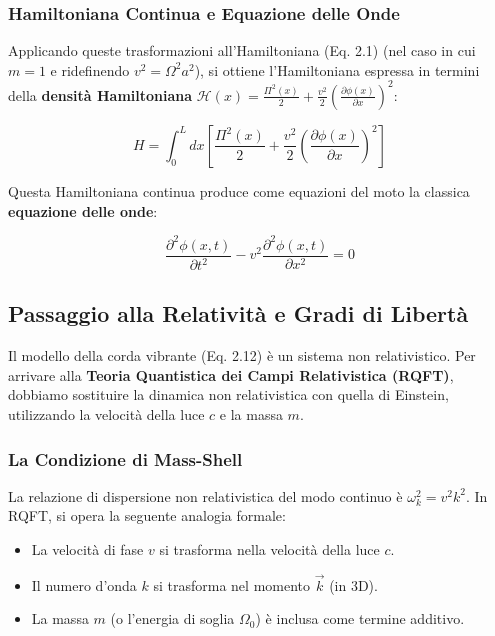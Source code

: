 \subsubsection{Hamiltoniana Continua e Equazione delle Onde}

Applicando queste trasformazioni all'Hamiltoniana (Eq. 2.1) (nel caso in cui $m=1$ e ridefinendo $v^2 = \Omega^2 a^2$), si ottiene l'Hamiltoniana espressa in termini della \textbf{densità Hamiltoniana} $\mathcal{H}(x) = \frac{\Pi^2(x)}{2} + \frac{v^2}{2} (\frac{\partial \phi(x)}{\partial x})^2$:

\begin{equation}
H = \int_{0}^{L} dx \left[ \frac{\Pi^2(x)}{2} + \frac{v^2}{2} \left( \frac{\partial \phi(x)}{\partial x} \right)^2 \right]
\end{equation}

Questa Hamiltoniana continua produce come equazioni del moto la classica \textbf{equazione delle onde}:

\begin{equation}
\frac{\partial^2 \phi(x,t)}{\partial t^2} - v^2 \frac{\partial^2 \phi(x,t)}{\partial x^2} = 0
\end{equation}

\subsection{Passaggio alla Relatività e Gradi di Libertà}

Il modello della corda vibrante (Eq. 2.12) è un sistema non relativistico. Per arrivare alla \textbf{Teoria Quantistica dei Campi Relativistica (RQFT)}, dobbiamo sostituire la dinamica non relativistica con quella di Einstein, utilizzando la velocità della luce $c$ e la massa $m$.

\subsubsection{La Condizione di Mass-Shell}

La relazione di dispersione non relativistica del modo continuo è $\omega_k^2 = v^2 k^2$. In RQFT, si opera la seguente analogia formale:
\begin{itemize}
    \item La velocità di fase $v$ si trasforma nella velocità della luce $c$.
    \item Il numero d'onda $k$ si trasforma nel momento $\vec{k}$ (in 3D).
    \item La massa $m$ (o l'energia di soglia $\Omega_0$) è inclusa come termine additivo.
\end{itemize}

